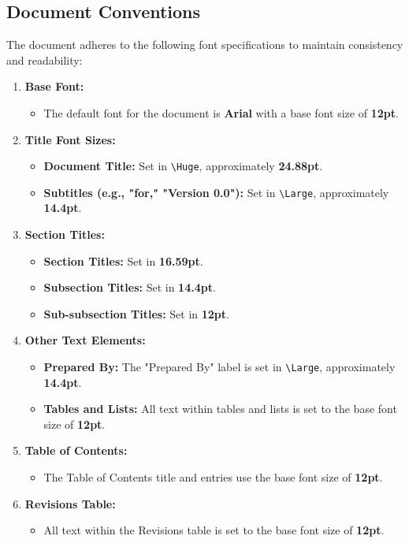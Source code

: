 \documentclass[a4paper,12pt]{article}
\begin{document}
\subsection{Document Conventions} \label{subsec:conventions}

The document adheres to the following font specifications to maintain consistency and readability:

\begin{enumerate}
    \item \textbf{Base Font:}
    \begin{itemize}
        \item The default font for the document is \textbf{Arial} with a base font size of \textbf{12pt}.
    \end{itemize}

    \item \textbf{Title Font Sizes:}
    \begin{itemize}
        \item \textbf{Document Title:} Set in \texttt{\textbackslash Huge}, approximately \textbf{24.88pt}.
        \item \textbf{Subtitles (e.g., "for," "Version 0.0"):} Set in \texttt{\textbackslash Large}, approximately \textbf{14.4pt}.
    \end{itemize}

    \item \textbf{Section Titles:}
    \begin{itemize}
        \item \textbf{Section Titles:} Set in \textbf{16.59pt}.
        \item \textbf{Subsection Titles:} Set in \textbf{14.4pt}.
        \item \textbf{Sub-subsection Titles:} Set in \textbf{12pt}.
    \end{itemize}

    \item \textbf{Other Text Elements:}
    \begin{itemize}
        \item \textbf{Prepared By:} The "Prepared By" label is set in \texttt{\textbackslash Large}, approximately \textbf{14.4pt}.
        \item \textbf{Tables and Lists:} All text within tables and lists is set to the base font size of \textbf{12pt}.
    \end{itemize}

    \item \textbf{Table of Contents:}
    \begin{itemize}
        \item The Table of Contents title and entries use the base font size of \textbf{12pt}.
    \end{itemize}

    \item \textbf{Revisions Table:}
    \begin{itemize}
        \item All text within the Revisions table is set to the base font size of \textbf{12pt}.
    \end{itemize}
\end{enumerate}
\end{document}
